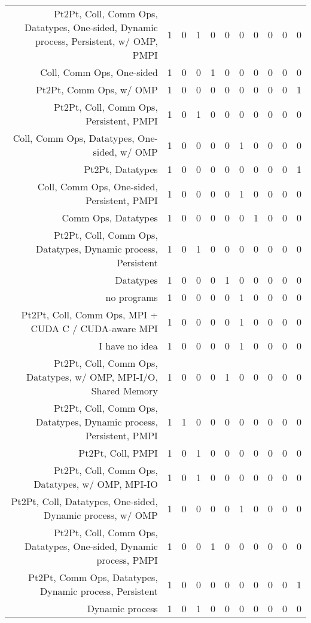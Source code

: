 {\begin{landscape}
\begin{longtable}[htb]{r|c|c|c|c|c|c|c|c|c|c}
{Pt2Pt, Coll, Comm Ops, Datatypes, One-sided, Dynamic process, Persistent, w/ OMP, PMPI} & 1 & 0 & 1 & 0 & 0 & 0 & 0 & 0 & 0 & 0 \\%
{Coll, Comm Ops, One-sided} & 1 & 0 & 0 & 1 & 0 & 0 & 0 & 0 & 0 & 0 \\%
{Pt2Pt, Comm Ops, w/ OMP} & 1 & 0 & 0 & 0 & 0 & 0 & 0 & 0 & 0 & 1 \\%
{Pt2Pt, Coll, Comm Ops, Persistent, PMPI} & 1 & 0 & 1 & 0 & 0 & 0 & 0 & 0 & 0 & 0 \\%
{Coll, Comm Ops, Datatypes, One-sided, w/ OMP} & 1 & 0 & 0 & 0 & 0 & 1 & 0 & 0 & 0 & 0 \\%
{Pt2Pt, Datatypes} & 1 & 0 & 0 & 0 & 0 & 0 & 0 & 0 & 0 & 1 \\%
{Coll, Comm Ops, One-sided, Persistent, PMPI} & 1 & 0 & 0 & 0 & 0 & 1 & 0 & 0 & 0 & 0 \\%
{Comm Ops, Datatypes} & 1 & 0 & 0 & 0 & 0 & 0 & 1 & 0 & 0 & 0 \\%
{Pt2Pt, Coll, Comm Ops, Datatypes, Dynamic process, Persistent} & 1 & 0 & 1 & 0 & 0 & 0 & 0 & 0 & 0 & 0 \\%
{Datatypes} & 1 & 0 & 0 & 0 & 1 & 0 & 0 & 0 & 0 & 0 \\%
{no programs} & 1 & 0 & 0 & 0 & 0 & 1 & 0 & 0 & 0 & 0 \\%
{Pt2Pt, Coll, Comm Ops, MPI + CUDA C / CUDA-aware MPI} & 1 & 0 & 0 & 0 & 0 & 1 & 0 & 0 & 0 & 0 \\%
{I have no idea} & 1 & 0 & 0 & 0 & 0 & 1 & 0 & 0 & 0 & 0 \\%
{Pt2Pt, Coll, Comm Ops, Datatypes, w/ OMP, MPI-I/O, Shared Memory} & 1 & 0 & 0 & 0 & 1 & 0 & 0 & 0 & 0 & 0 \\%
{Pt2Pt, Coll, Comm Ops, Datatypes, Dynamic process, Persistent, PMPI} & 1 & 1 & 0 & 0 & 0 & 0 & 0 & 0 & 0 & 0 \\%
{Pt2Pt, Coll, PMPI} & 1 & 0 & 1 & 0 & 0 & 0 & 0 & 0 & 0 & 0 \\%
{Pt2Pt, Coll, Comm Ops, Datatypes, w/ OMP, MPI-IO} & 1 & 0 & 1 & 0 & 0 & 0 & 0 & 0 & 0 & 0 \\%
{Pt2Pt, Coll, Datatypes, One-sided, Dynamic process, w/ OMP} & 1 & 0 & 0 & 0 & 0 & 1 & 0 & 0 & 0 & 0 \\%
{Pt2Pt, Coll, Comm Ops, Datatypes, One-sided, Dynamic process, PMPI} & 1 & 0 & 0 & 1 & 0 & 0 & 0 & 0 & 0 & 0 \\%
{Pt2Pt, Comm Ops, Datatypes, Dynamic process, Persistent} & 1 & 0 & 0 & 0 & 0 & 0 & 0 & 0 & 0 & 1 \\%
{Dynamic process} & 1 & 0 & 1 & 0 & 0 & 0 & 0 & 0 & 0 & 0 \\%

\end{longtable}
\end{landscape}}

